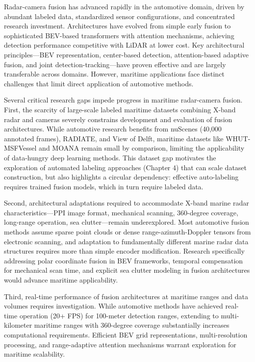 Radar-camera fusion has advanced rapidly in the automotive domain, driven by abundant labeled data, standardized sensor configurations, and concentrated research investment. Architectures have evolved from simple early fusion to sophisticated BEV-based transformers with attention mechanisms, achieving detection performance competitive with LiDAR at lower cost. Key architectural principles—BEV representation, center-based detection, attention-based adaptive fusion, and joint detection-tracking—have proven effective and are largely transferable across domains. However, maritime applications face distinct challenges that limit direct application of automotive methods.

Several critical research gaps impede progress in maritime radar-camera fusion. First, the scarcity of large-scale labeled maritime datasets combining X-band radar and cameras severely constrains development and evaluation of fusion architectures. While automotive research benefits from nuScenes (40,000 annotated frames), RADIATE, and View of Delft, maritime datasets like WHUT-MSFVessel and MOANA remain small by comparison, limiting the applicability of data-hungry deep learning methods. This dataset gap motivates the exploration of automated labeling approaches (Chapter 4) that can scale dataset construction, but also highlights a circular dependency: effective auto-labeling requires trained fusion models, which in turn require labeled data.

Second, architectural adaptations required to accommodate X-band marine radar characteristics—PPI image format, mechanical scanning, 360-degree coverage, long-range operation, sea clutter—remain underexplored. Most automotive fusion methods assume sparse point clouds or dense range-azimuth-Doppler tensors from electronic scanning, and adaptation to fundamentally different marine radar data structures requires more than simple encoder modification. Research specifically addressing polar coordinate fusion in BEV frameworks, temporal compensation for mechanical scan time, and explicit sea clutter modeling in fusion architectures would advance maritime applicability.

Third, real-time performance of fusion architectures at maritime ranges and data volumes requires investigation. While automotive methods have achieved real-time operation (20+ FPS) for 100-meter detection ranges, extending to multi-kilometer maritime ranges with 360-degree coverage substantially increases computational requirements. Efficient BEV grid representations, multi-resolution processing, and range-adaptive attention mechanisms warrant exploration for maritime scalability.

